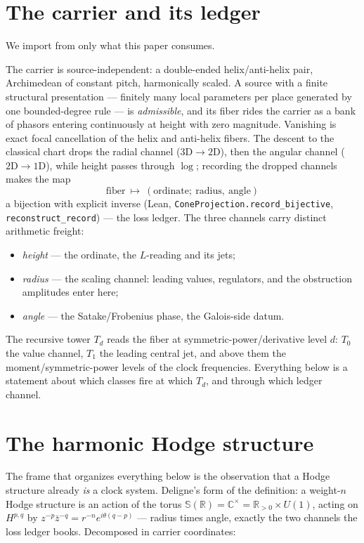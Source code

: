\documentclass[11pt]{article}
\theoremstyle{definition}
\theoremstyle{remark}
\begin{document}
\section{The carrier and its ledger}\label{sec:ledger}

We import from \cite{Universal} only what this paper consumes.

The carrier is source-independent: a double-ended helix/anti-helix pair,
Archimedean of constant pitch, harmonically scaled. A source with a finite
structural presentation --- finitely many local parameters per place generated
by one bounded-degree rule --- is \emph{admissible}, and its fiber rides the
carrier as a bank of phasors entering continuously at height with zero
magnitude. Vanishing is exact focal cancellation of the helix and anti-helix
fibers. The descent to the classical chart drops the radial channel
($3\mathrm D\to2\mathrm D$), then the angular channel
($2\mathrm D\to1\mathrm D$), while height passes through $\log$; recording the
dropped channels makes the map
\[
  \text{fiber}\ \longmapsto\ (\text{ordinate};\ \text{radius},\ \text{angle})
\]
a bijection with explicit inverse (Lean,
\texttt{ConeProjection.record\_bijective}, \texttt{reconstruct\_record}) ---
the loss ledger. The three channels carry distinct arithmetic freight:
\begin{itemize}
\item \emph{height} --- the ordinate, the $L$-reading and its jets;
\item \emph{radius} --- the scaling channel: leading values, regulators, and
the obstruction amplitudes enter here;
\item \emph{angle} --- the Satake/Frobenius phase, the Galois-side datum.
\end{itemize}
The recursive tower $T_d$ reads the fiber at symmetric-power/derivative level
$d$: $T_0$ the value channel, $T_1$ the leading central jet, and above them the
moment/symmetric-power levels of the clock frequencies. Everything below is a
statement about which classes fire at which $T_d$, and through which ledger
channel.

\section{The harmonic Hodge structure}\label{sec:harmonic}

The frame that organizes everything below is the observation that a Hodge
structure already \emph{is} a clock system. Deligne's form of the definition:
a weight-$n$ Hodge structure is an action of the torus
$\mathbb S(\mathbb R)=\mathbb C^\times=\mathbb R_{>0}\times U(1)$, acting on
$H^{p,q}$ by $z^{-p}\bar z^{-q}=r^{-n}e^{i\theta(q-p)}$ --- radius times angle,
exactly the two channels the loss ledger books. Decomposed in carrier
coordinates:
\end{document}
